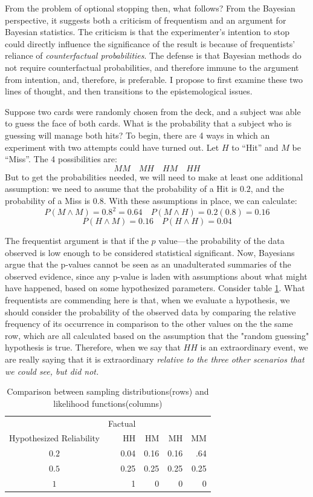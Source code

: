 From the problem of optional stopping then, what follows? From the
Bayesian perspective, it suggests both a criticism of frequentism and an
argument for Bayesian statistics. The criticism is that the
experimenter's intention to stop could directly influence the
significance of the result is because of frequentists' reliance of
\emph{counterfactual probabilities}. The defense is that Bayesian
methods do not require counterfactual probabilities, and therefore
immune to the argument from intention, and, therefore, is preferable. I
propose to first examine these two lines of thought, and then
transitions to the epistemological issues.

Suppose two cards were randomly chosen from the deck, and a subject was able to guess the face of both cards. What is the probability that a subject who is guessing will manage  both hits? To begin, there are 4 ways in which an experiment with
two attempts could have turned out. Let \(H\) to ``Hit'' and \(M\) be
``Miss''. The 4 possibilities are: \[MM \quad MH \quad HM \quad HH\] But
to get the probabilities needed, we will need to make at least one
additional assumption: we need to assume that the probability of a Hit is $0.2$, and the probability of a Miss is $0.8$. With these assumptions in place, we can calculate:
\[P(M\wedge M)=0.8^2=0.64 \quad P(M\wedge H)=0.2(0.8)=0.16\]
\[P(H \wedge M)=0.16 \quad P(H \wedge H)=0.04\]

The frequentist argument is that if the $p$ value---the probability of the data observed is low enough to be considered statistical significant. Now, Bayesians argue that the p-values cannot be
seen as an unadulterated summaries of the observed evidence, since any p-value is laden with assumptions about what might have happened, based on some hypothesized parameters. Consider table \ref{tab:likelihoodvscf}. What frequentists are commending here is that, when we evaluate a hypothesis, we should consider the probability of the observed data by comparing the relative frequency of its occurrence in comparison to the other values on the the same row, which are all calculated based on the assumption that the "random guessing" hypothesis is true. Therefore, when we say that $HH$ is an extraordinary event, we are really saying that it is extraordinary \emph{relative to the three other scenarios that we could see, but did not.}

\begin{table}[]
\centering
\begin{tabular}{@{}crrrr@{}}
\toprule
 & Factual & \multicolumn{3}{l}{} Counterfactual\\ 
Hypothesized Reliability & HH & HM      & MH      &  MM    \\\midrule
$0.2$ & 0.04 &   0.16    &   0.16    &    .64  \\
 $0.5$& 0.25 &    0.25   &   0.25    &    0.25  \\
 $1$& 1 &   0    &   0    &   0   \\ \bottomrule
\end{tabular}
  \label{tab:likelihoodvscf}
  \caption{Comparison between sampling distributions(rows) and likelihood functions(columns)}
\end{table}

